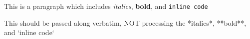 
This is a paragraph which includes \textit{italics}, \textbf{bold}, and \verb|inline code|

This should be passed along verbatim, NOT processing the *italics*, **bold**, and `inline code`